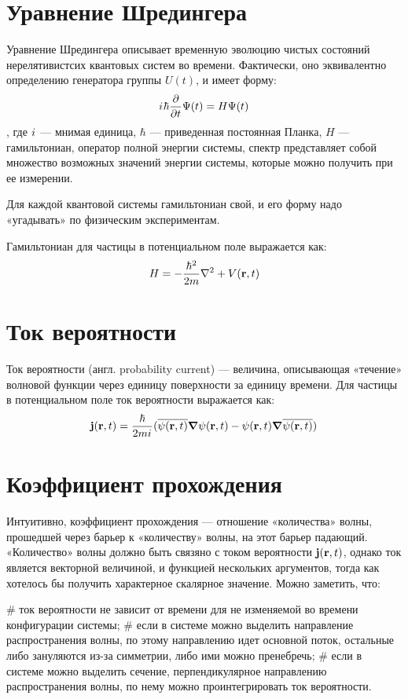 \section{Уравнение Шредингера}
Уравнение Шредингера описывает временную эволюцию чистых состояний нерелятивистсих квантовых систем во времени. Фактически, оно эквивалентно определению генератора группы $U(t)$, и имеет форму:
\[
{i\mkern1mu} \hbar \pdv{t} \Psi(t) = H \Psi(t)
\]
, где ${i\mkern1mu}$ — мнимая единица, $\hbar$ — приведенная постоянная Планка, $H$ — гамильтониан, оператор полной энергии системы, спектр представляет собой множество возможных значений энергии системы, которые можно получить при ее измерении.

Для каждой квантовой системы гамильтониан свой, и его форму надо «угадывать» по физическим экспериментам.

Гамильтониан для частицы в потенциальном поле выражается как:
\[
H = - \frac{\hbar^2}{2 m} \laplacian + V(\vb{r}, t)
\]

\section{Ток вероятности}
Ток вероятности (англ. probability current) — величина, описывающая «течение» волновой функции через единицу поверхности за единицу времени.  Для частицы в потенциальном поле ток вероятности выражается как:
\[
\vb{j}(\vb{r}, t) = \frac{\hbar}{2 m {i\mkern1mu}} (\overline{\psi(\vb{r}, t)} \grad{\psi(\vb{r}, t)} - \psi(\vb{r}, t) \grad{\overline{\psi(\vb{r}, t)})}
\]

\section{Коэффициент прохождения}
Интуитивно, коэффициент прохождения — отношение «количества» волны, прошедшей через барьер к «количеству» волны, на этот барьер падающий. «Количество» волны должно быть связяно с током вероятности $\vb{j}(\vb{r}, t)$, однако ток является векторной величиной, и функцией нескольких аргументов, тогда как хотелось бы получить характерное скалярное значение. Можно заметить, что:

\begin{easylist}[itemize]
# ток вероятности не зависит от времени для не изменяемой во времени конфигурации системы;
# если в системе можно выделить направление распространения волны, по этому направлению идет основной поток, остальные либо зануляются из-за симметрии, либо ими можно пренебречь;
# если в системе можно выделить сечение, перпендикулярное направлению распространения волны, по нему можно проинтегрировать ток вероятности.
\end{easylist}

